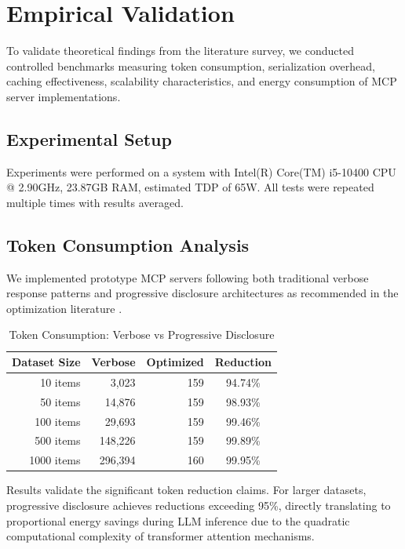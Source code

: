 
\section{Empirical Validation}

To validate theoretical findings from the literature survey, we conducted controlled benchmarks measuring token consumption, serialization overhead, caching effectiveness, scalability characteristics, and energy consumption of MCP server implementations.

\subsection{Experimental Setup}

Experiments were performed on a system with Intel(R) Core(TM) i5-10400 CPU @ 2.90GHz, 23.87GB RAM, estimated TDP of 65W. All tests were repeated multiple times with results averaged.

\subsection{Token Consumption Analysis}

We implemented prototype MCP servers following both traditional verbose response patterns and progressive disclosure architectures as recommended in the optimization literature \cite{anthropic2025code}.


\begin{table}[h]
\centering
\caption{Token Consumption: Verbose vs Progressive Disclosure}
\label{tab:token_benchmark}
\begin{tabular}{rrrc}
\toprule
\textbf{Dataset Size} & \textbf{Verbose} & \textbf{Optimized} & \textbf{Reduction} \\
\midrule
10 items & 3,023 & 159 & 94.74\% \\
50 items & 14,876 & 159 & 98.93\% \\
100 items & 29,693 & 159 & 99.46\% \\
500 items & 148,226 & 159 & 99.89\% \\
1000 items & 296,394 & 160 & 99.95\% \\
\bottomrule
\end{tabular}
\end{table}

Results validate the significant token reduction claims. For larger datasets, progressive disclosure achieves reductions exceeding 95\%, directly translating to proportional energy savings during LLM inference due to the quadratic computational complexity of transformer attention mechanisms.

